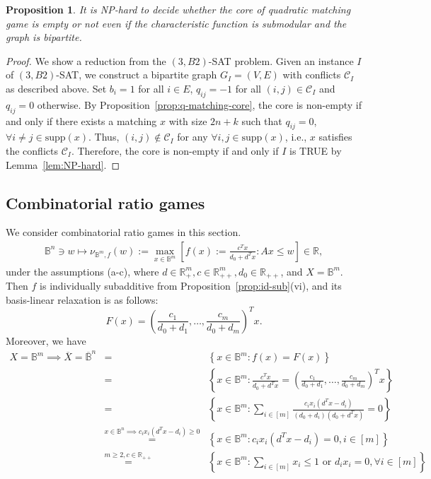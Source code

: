 \documentclass[11pt]{article}\usepackage[]{graphicx}\usepackage[]{xcolor}
\newtheorem{prop}{Proposition}
\begin{document}
\begin{prop}\label{prop:assignment-NP-hard}
It is NP-hard to decide whether the core of quadratic matching game is empty or not even if the characteristic function is submodular and the graph is bipartite.
\end{prop}

\begin{proof}
We show a reduction from the $(3,B2)$-SAT problem.
Given an instance $I$ of $(3,B2)$-SAT, we construct a bipartite graph $G_I=(V,E)$ with conflicts $\mathcal{C}_I$ as described above.
Set $b_i=1$ for all $i\in E$, $q_{ij}=-1$ for all $(i,j)\in \mathcal{C}_I$ and $q_{ij}=0$ otherwise.
By Proposition~\ref{prop:q-matching-core}, the core is non-empty if and only if there exists a matching $x$ with size $2n+k$ such that $q_{ij}=0$, $\forall i\neq j\in\text{supp}(x)$.
Thus, $(i,j)\notin \mathcal{C}_I$ for any $\forall i,j\in\text{supp}(x)$, i.e., $x$ satisfies the conflicts $\mathcal{C}_I$.
Therefore, the core is non-empty if and only if $I$ is TRUE by Lemma~\ref{lem:NP-hard}.
\end{proof}


\subsection{Combinatorial ratio games}


We consider combinatorial ratio games in this section. 
\begin{eqnarray}
\label{game:packing-subadditive-ratio}\mathbb{B}^n\ni w\mapsto \nu_{\mathbb{B}^m, f}(w):=\max\limits_{x\in \mathbb{B}^m} \left[f(x):=\frac{c^T x}{d_0+d^T x}: Ax\le w\right]\in  \mathbb{R},
\end{eqnarray}
under the assumptions (a-c), where $d\in \mathbb{R}^m_{+}, c\in \mathbb{R}^m_{++}, d_0\in \mathbb{R}_{++}$, and $X=\mathbb{B}^m$.
Then $f$ is individually subadditive from Proposition~\ref{prop:id-sub}(vi), and its basis-linear relaxation is as follows:
\[
F(x)=\left(\frac{c_1}{d_0+d_1},\ldots,\frac{c_m}{d_0+d_m}\right)^T x. 
\]
Moreover, we have
\begin{eqnarray*}
\nonumber X=\mathbb{B}^m\implies \overline{X}=\overline{\mathbb{B}}^n&=&\left\{x\in \mathbb{B}^m: f(x)=F(x)\right\}\\
\nonumber&=&\left\{x\in\mathbb{B}^m: \frac{c^T x}{d_0+d^T x}=\left(\frac{c_1}{d_0+d_1},\ldots,\frac{c_m}{d_0+d_m}\right)^T x\right\}\\
\nonumber&=&\left\{x\in\mathbb{B}^m: \sum_{i\in[m]}\frac{c_ix_i\left(d^Tx-d_i\right)}{(d_0+d_i)(d_0+d^Tx)}=0 \right\}\\
\nonumber&\overset{x\in\mathbb{B}^n\implies c_ix_i\left(d^Tx-d_i\right)\ge 0}{=}&\left\{x\in\mathbb{B}^m: c_ix_i\left(d^Tx-d_i\right)=0, i\in [m]\right\}\\
\label{eq:ratio-f=F}&\overset{m\ge 2, c\in\mathbb{R}_{++}}{=}&
\left\{x\in\mathbb{B}^m: \sum_{i\in[m]}x_i\le 1 \text{ or } d_ix_i=0, \forall i\in [m]\right\}
\end{eqnarray*}
\end{document}
